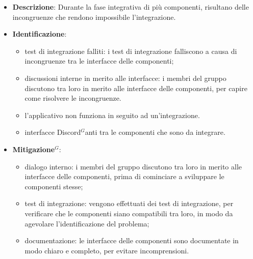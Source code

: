 \label{risk:interfacce incoerenti}
\begin{itemize}
	\item \textbf{Descrizione}:
	      Durante la fase integrativa di più componenti, risultano delle
	      incongruenze che rendono impossibile l'integrazione.
	\item \textbf{Identificazione}:
	      \begin{itemize}
		      \item test di integrazione falliti: i test di integrazione
		            falliscono a causa di incongruenze tra le interfacce delle
		            componenti;

		      \item discussioni interne in merito alle interfacce: i membri
		            del gruppo discutono tra loro in merito alle interfacce
		            delle componenti, per capire come risolvere le incongruenze.

		      \item l'applicativo non funziona in seguito ad un'integrazione.

		      \item interfacce \gls{Discord}$^G$anti tra le componenti che sono da
		            integrare.
	      \end{itemize}
	\item \textbf{\gls{Mitigazione}$^G$}:
	      \begin{itemize}
		      \item dialogo interno: i membri del gruppo discutono tra loro
		            in merito alle interfacce delle componenti, prima di
		            cominciare a sviluppare le componenti stesse;

		      \item test di integrazione: vengono effettuati dei test di
		            integrazione, per verificare che le componenti siano
		            compatibili tra loro, in modo da agevolare l'identificazione
		            del problema;

		      \item documentazione: le interfacce delle componenti sono
		            documentate in modo chiaro e completo, per evitare
		            incomprensioni.
	      \end{itemize}
\end{itemize}
